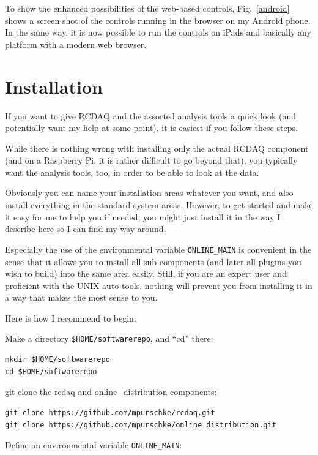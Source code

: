 \documentclass{article}[11pt]
\begin{document}
To show the enhanced possibilities of the web-based controls,
Fig.~\ref{android} shows a screen shot of the controls running in the
browser on my Android phone. In the same way, it is now possible to
run the controls on iPads and basically any platform with a modern web
browser.


\section{Installation}
\label{installation}

If you want to give RCDAQ and the assorted analysis tools a quick look
(and potentially want my help at some point), it is easiest if you
follow these steps.

While there is nothing wrong with installing only the actual RCDAQ
component (and on a Raspberry Pi, it is rather difficult to go beyond
that), you typically want the analysis tools, too, in order to be able
to look at the data.

Obviously you can name your installation areas whatever you want, and
also install everything in the standard system areas. However, to get
started and make it easy for me to help you if needed, you might just
install it in the way I describe here so I can find my way around.

Especially the use of the environmental variable \verb|ONLINE_MAIN| is
convenient in the sense that it allows you to install all
sub-components (and later all plugins you wish to build) into the same
area easily. Still, if you are an expert user and proficient with the
UNIX auto-tools, nothing will prevent you from installing it in a way
that makes the most sense to you.

Here is how I recommend to begin:

Make a directory {\tt \$HOME/softwarerepo}, and ``cd'' there:

\begin{verbatim}
mkdir $HOME/softwarerepo
cd $HOME/softwarerepo
\end{verbatim}

git clone the rcdaq and online\_distribution components:

\begin{verbatim}
git clone https://github.com/mpurschke/rcdaq.git
git clone https://github.com/mpurschke/online_distribution.git
\end{verbatim}

Define an environmental variable \verb|ONLINE_MAIN|:
\end{document}
